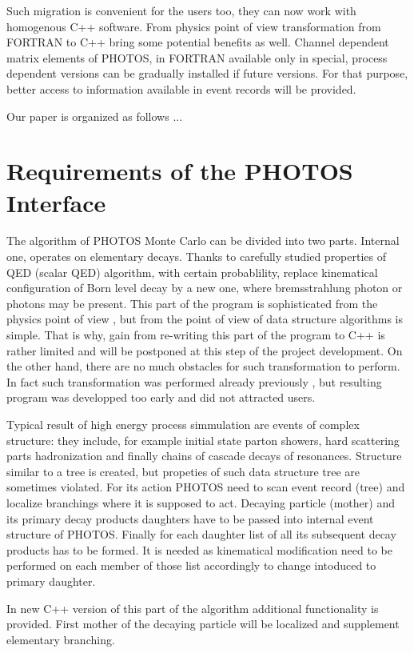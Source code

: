 \documentclass[]{Photos_interface_design}
\begin{document}
Such migration is convenient for the users too,  they can now work
with  homogenous C++ software. From physics point of view transformation 
from FORTRAN to C++  bring some potential benefits as well.
Channel dependent matrix elements of PHOTOS, in FORTRAN available only 
in special, process dependent versions
can be gradually   
installed if future versions. 
For that purpose, better access to information available in event records
will be provided.

Our paper is organized as follows ...



\section{Requirements of the PHOTOS Interface}
The algorithm of PHOTOS Monte Carlo can be divided into two parts.
Internal one, operates on elementary decays. Thanks to carefully 
studied properties of 
QED (scalar QED) algorithm, with certain probablility, 
replace  kinematical configuration of Born level decay by a new one, 
where bremsstrahlung photon or photons
may be present. This part of the program is sophisticated from the physics 
point of view \cite{Nanava:2006vv,},
but from the point of view of data structure algorithms is simple.
That is why, gain from re-writing this part of the program to C++ is rather
limited and will be postponed at this step of the project development.
On the other hand, there are no much obstacles for such transformation to 
perform. In fact such transformation was performed already
previously \cite{GolonkaMSc}, but resulting program was developped too early 
and did not attracted users.

Typical result of high energy process simmulation are events of complex structure:
they include, for example initial state parton showers, hard scattering parts 
hadronization and finally chains of cascade decays of resonances. 
Structure similar to a tree is created, but propeties of such data structure
tree are sometimes violated.
For its action PHOTOS need to scan event record (tree) 
and localize branchings where
it is supposed to act. Decaying particle (mother) and its primary decay products
daughters have to be passed into internal event structure of PHOTOS. 
Finally for each daughter list of all its subsequent decay products has to be 
formed. It is needed as kinematical modification need to be performed on each 
member of those list accordingly to change intoduced to primary daughter.

In new C++ version of this part of the algorithm additional functionality
is provided.
First mother of the decaying particle will be localized and supplement 
elementary branching. 
\end{document}
